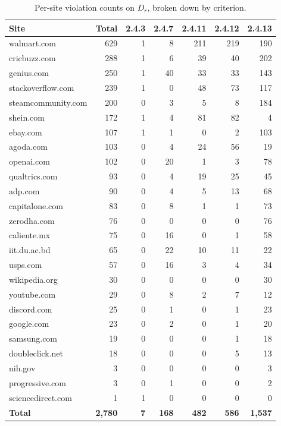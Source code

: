 \begin{table}[ht]
  \centering
  \caption{Per-site violation counts on $D_r$, broken down by criterion.}
  \label{tab:persite}
  \begin{tabular}{lrrrrrr}
    \toprule
    Site & Total & 2.4.3 & 2.4.7 & 2.4.11 & 2.4.12 & 2.4.13 \\
    \midrule
    walmart.com        & 629 & 1 & 8  & 211 & 219 & 190 \\
    cricbuzz.com       & 288 & 1 & 6  & 39  & 40  & 202 \\
    genius.com         & 250 & 1 & 40 & 33  & 33  & 143 \\
    stackoverflow.com  & 239 & 1 & 0  & 48  & 73  & 117 \\
    steamcommunity.com & 200 & 0 & 3  & 5   & 8   & 184 \\
    shein.com          & 172 & 1 & 4  & 81  & 82  & 4   \\
    ebay.com           & 107 & 1 & 1  & 0   & 2   & 103 \\
    agoda.com          & 103 & 0 & 4  & 24  & 56  & 19  \\
    openai.com         & 102 & 0 & 20 & 1   & 3   & 78  \\
    qualtrics.com      & 93  & 0 & 4  & 19  & 25  & 45  \\
    adp.com            & 90  & 0 & 4  & 5   & 13  & 68  \\
    capitalone.com     & 83  & 0 & 8  & 1   & 1   & 73  \\
    zerodha.com        & 76  & 0 & 0  & 0   & 0   & 76  \\
    caliente.mx        & 75  & 0 & 16 & 0   & 1   & 58  \\
    iit.du.ac.bd       & 65  & 0 & 22 & 10  & 11  & 22  \\
    usps.com           & 57  & 0 & 16 & 3   & 4   & 34  \\
    wikipedia.org      & 30  & 0 & 0  & 0   & 0   & 30  \\
    youtube.com        & 29  & 0 & 8  & 2   & 7   & 12  \\
    discord.com        & 25  & 0 & 1  & 0   & 1   & 23  \\
    google.com         & 23  & 0 & 2  & 0   & 1   & 20  \\
    samsung.com        & 19  & 0 & 0  & 0   & 1   & 18  \\
    doubleclick.net    & 18  & 0 & 0  & 0   & 5   & 13  \\
    nih.gov            & 3   & 0 & 0  & 0   & 0   & 3   \\
    progressive.com    & 3   & 0 & 1  & 0   & 0   & 2   \\
    sciencedirect.com  & 1   & 1 & 0  & 0   & 0   & 0   \\
    \midrule
    \textbf{Total}     & \textbf{2{,}780} & \textbf{7} & \textbf{168} & \textbf{482} & \textbf{586} & \textbf{1{,}537} \\
    \bottomrule
  \end{tabular}
\end{table}


